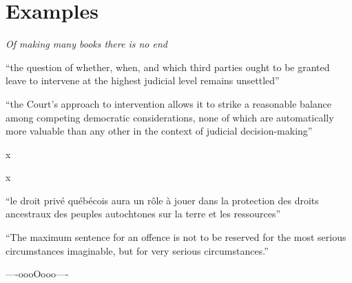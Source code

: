 \section{Examples}
\hfill{\itshape Of making many books there is no end}\par

\bigskip
``the question of whether, when, and which third parties ought to be granted leave to intervene at the highest judicial level remains unsettled''

``the Court’s approach to intervention allows it to strike a reasonable balance among competing democratic considerations, none of which are automatically more valuable than any other in the context of judicial decision-making''

x 

x

``le droit privé québécois aura un rôle à jouer dans la protection des droits ancestraux des peuples autochtones sur la terre et les ressources''

``The maximum sentence for an offence is not to be reserved for the most serious circumstances imaginable, but for very serious circumstances.''

\bigskip
\hfill ----oooOooo---- \hfill\ 
\newpage
{\center
\printbibheading[title=Bibliography]
}
\newrefcontext[sorting=statsort]
\printbibliography[
	title=\center Legislation,
	heading=subbibliography,%
	type=statute,
	]
\newrefcontext[sorting=casesort]
\printbibliography[
	title=\center Jurisprudence,
	heading=subbibliography,%
	type=case,
	]
\newrefcontext[sorting=nty]
\printbibliography[
	heading=subbibliography,%
	keyword=lawbook,
	title={\center Secondary Materials: Monographs},
	]
\newrefcontext[sorting=nty]
\printbibliography[
	heading=subbibliography,%
	title={\center Secondary Materials: Articles},
	type=ljarticle,
	]

\bigskip
\hfill{}\hfill\ %
\bigskip
%
\printbibliography[
	heading=subbibliography,%
	nottype=case,
	nottype=statute,
	nottype=ljarticle,
	notkeyword=lawbook,
	title={\center General Material},
		]


